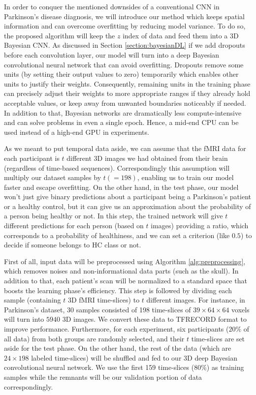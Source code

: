 \documentclass[a4paper,fleqn]{cas-dc}
\begin{document}
In order to conquer the mentioned downsides of a conventional CNN in Parkinson's disease diagnosis, we will introduce our method which keeps spatial information and can overcome overfitting by reducing model variance. To do so, the proposed algorithm will keep the $z$ index of data and feed them into a 3D Bayesian CNN. As discussed in Section \ref{section:bayesianDL} if we add dropouts before each convolution layer, our model will turn into a deep Bayesian convolutional neural network that can avoid overfitting. Dropouts remove some units (by setting their output values to zero) temporarily which enables other units to justify their weights. Consequently, remaining units in the training phase can precisely adjust their weights to more appropriate ranges if they already hold acceptable values, or keep away from unwanted boundaries noticeably if needed. In addition to that, Bayesian networks are dramatically less compute-intensive and can solve problems in even a single epoch. Hence, a mid-end CPU can be used instead of a high-end GPU in experiments.

As we meant to put temporal data aside, we can assume that the fMRI data for each participant is $t$ different 3D images we had obtained from their brain (regardless of time-based sequences). Correspondingly this assumption will multiply our dataset samples by $t (=198)$, enabling us to train our model faster and escape overfitting. On the other hand, in the test phase, our model won't just give binary predictions about a participant being a Parkinson's patient or a healthy control, but it can give us an approximation about the probability of a person being healthy or not. In this step, the trained network will give $t$ different predictions for each person (based on $t$ images) providing a ratio, which corresponds to a probability of healthiness, and we can set a criterion (like $0.5$) to decide if someone belongs to HC class or not.


First of all, input data will be preprocessed using Algorithm \ref{alg:preprocessing}, which removes noises and non-informational data parts (such as the skull). In addition to that, each patient's scan will be normalized to a standard space that boosts the learning phase's efficiency. This step is followed by dividing each sample (containing $t$ 3D fMRI time-slices) to $t$ different images. For instance, in Parkinson's dataset, 30 samples consisted of 198 time-slices of \texttt{$39 \times 64 \times 64$} voxels will turn into $5940$ 3D images. We convert these data to TFRECORD format to improve performance. Furthermore, for each experiment, six participants ($20\%$ of all data) from both groups are randomly selected, and their $t$ time-slices are set aside for the test phase. On the other hand, the rest of the data (which are $24 \times 198$ labeled time-slices) will be shuffled and fed to our 3D deep Bayesian convolutional neural network. We use the first 159 time-slices ($80\%$) as training samples while the remnants will be our validation portion of data correspondingly. 
\end{document}
